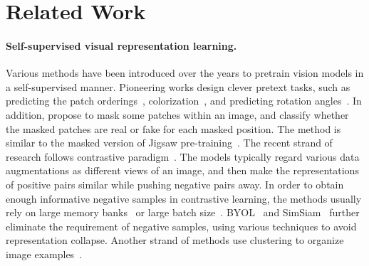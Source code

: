 \documentclass{article}
\begin{document}
\section{Related Work}
\label{sec:related:work}

\paragraph{Self-supervised visual representation learning.}
Various methods have been introduced over the years to pretrain vision models in a self-supervised manner.
Pioneering works design clever pretext tasks, such as predicting the patch orderings~\citep{jigsaw}, colorization~\citep{colorization}, and predicting rotation angles~\citep{rotation}.
In addition, \citep{selfie} propose to mask some patches within an image, and classify whether the masked patches are real or fake for each masked position. The method is similar to the masked version of Jigsaw pre-training~\citep{jigsaw}.
The recent strand of research follows contrastive paradigm~\citep{wu2018unsupervised,cpc,dim,amdim,moco,simclr,mocov2}. The models typically regard various data augmentations as different views of an image, and then make the representations of positive pairs similar while pushing negative pairs away.
In order to obtain enough informative negative samples in contrastive learning, the methods usually rely on large memory banks~\citep{wu2018unsupervised,moco} or large batch size~\citep{simclr}.
BYOL~\citep{byol} and SimSiam~\citep{simsiam} further eliminate the requirement of negative samples, using various techniques to avoid representation collapse.
Another strand of methods use clustering to organize image examples~\citep{deepcluster,sela,swav,li2021prototypical}.
\end{document}
